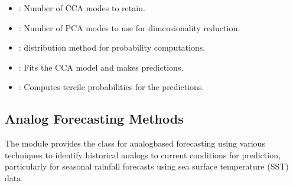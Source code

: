 \documentclass[letterpaper,10pt,english]{sphinxmanual}
\begin{document}
\sphinxAtStartPar
{}
\begin{itemize}
\item {} 
\sphinxAtStartPar
{}: Number of CCA modes to retain.

\item {} 
\sphinxAtStartPar
{}: Number of PCA modes to use for dimensionality reduction.

\item {} 
\sphinxAtStartPar
{}: distribution method for probability computations.

\end{itemize}

\sphinxAtStartPar
{}
\begin{itemize}
\item {} 
\sphinxAtStartPar
{}: Fits the CCA model and makes predictions.

\item {} 
\sphinxAtStartPar
{}: Computes tercile probabilities for the predictions.

\end{itemize}

\sphinxAtStartPar
{}


\subsection{Analog Forecasting Methods}
\label{\detokenize{Models:analog-forecasting-methods}}
\sphinxAtStartPar
The  module provides the  class for analog\sphinxhyphen{}based forecasting using various techniques to identify historical analogs to current conditions for prediction, particularly for seasonal rainfall forecasts using sea surface temperature (SST) data.
\end{document}

